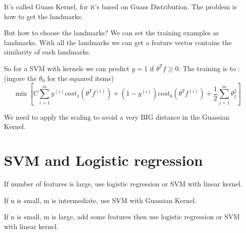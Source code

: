 \documentclass[en,11pt,english,black,simple]{../elegantbook}
\begin{document}
It's called Guass Kernel, for it's based on Guass Distribution. The problem is how to get the landmarks.

But how to choose the landmarks? We can set the training examples as landmarks. With all the landmarks we can get a feature vector contains the similarity of each landmarks. 

So for a SVM with kernels we can predict \(y = 1\) if \(\theta^T f \ge 0\). The training is to :(ingore the \(\theta_0\) for the squared items)
\[\min \left[C \sum_{i = 1}^m y^{(i)} cost_1 (\theta^T f^{(i)}) + (1-y^{(i)}) cost_0 (\theta^T f^{(i)}) + \frac{1}{2}\sum_{j=1}^{m}\theta_j^2\right]\]

We need to apply the scaling to avoid a very BIG distance in the Guassian Kernel.

\section{SVM and Logistic regression}

If number of features is large, use logistic regression or SVM with linear kernel.

If n is small, m is intermediate, use SVM with Guassian Kernel.

If n is small, m is large, add some features then use logistic regression or SVM with linear kernel.



\let\chapname\undefined
\ifx\mainclass\undefined
\end{document}
